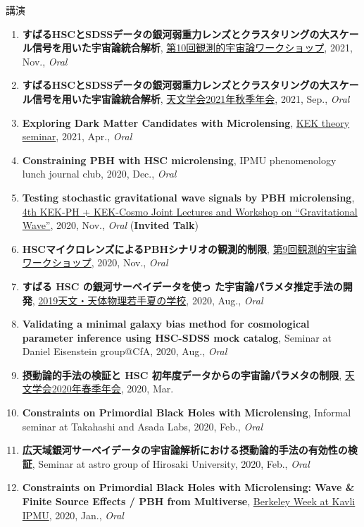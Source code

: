 \begin{rSection}{講演}
\begin{enumerate}
\item \textbf{すばるHSCとSDSSデータの銀河弱重力レンズとクラスタリングの大スケール信号を用いた宇宙論統合解析}, \href{https://sites.google.com/view/obscosmws2021main}{第10回観測的宇宙論ワークショップ}, 2021, Nov., \textit{Oral}
\item \textbf{すばるHSCとSDSSデータの銀河弱重力レンズとクラスタリングの大スケール信号を用いた宇宙論統合解析}, \href{https://www.asj.or.jp/nenkai/archive/2021b/pdf/U05a.pdf}{天文学会2021年秋季年会}, 2021, Sep., \textit{Oral}
\item \textbf{Exploring Dark Matter Candidates with Microlensing}, \href{https://www.kek.jp/ja/conference/20210407-3/}{KEK theory seminar}, 2021, Apr., \textit{Oral}
\item \textbf{Constraining PBH with HSC microlensing}, IPMU phenomenology lunch journal club, 2020, Dec., \textit{Oral}
\item \textbf{Testing stochastic gravitational wave signals by PBH microlensing}, \href{http://conference-indico.kek.jp/event/117/timetable/#day-2020-11-04}{4th KEK-PH + KEK-Cosmo Joint Lectures and Workshop on ``Gravitational Wave''}, 2020, Nov., \textit{Oral} (\textbf{Invited Talk})
\item \textbf{HSCマイクロレンズによるPBHシナリオの観測的制限}, \href{https://indico.ipmu.jp/event/382/timetable/#all}{第9回観測的宇宙論ワークショップ}, 2020, Nov., \textit{Oral}
\item \textbf{すばる HSC の銀河サーベイデータを使っ た宇宙論パラメタ推定手法の開発}, \href{http://www.astro-wakate.org/ss2019/web/}{2019天文・天体物理若手夏の学校}, 2020, Aug., \textit{Oral}
\item \textbf{Validating a minimal galaxy bias method for cosmological parameter inference using HSC-SDSS mock catalog}, Seminar at Daniel Eisenstein group@CfA, 2020, Aug., \textit{Oral}
\item \textbf{摂動論的手法の検証と HSC 初年度データからの宇宙論パラメタの制限}, \href{http://www.asj.or.jp/nenkai/archive/2020a/pdf/U03a.pdf}{天文学会2020年春季年会}, 2020, Mar.
\item \textbf{Constraints on Primordial Black Holes with Microlensing}, Informal seminar at Takahashi and Asada Labs, 2020, Feb., \textit{Oral}
\item \textbf{広天域銀河サーベイデータの宇宙論解析における摂動論的手法の有効性の検証}, Seminar at astro group of Hirosaki University, 2020, Feb., \textit{Oral}
\item \textbf{Constraints on Primordial Black Holes with Microlensing: Wave \& Finite Source Effects / PBH from Multiverse}, \href{http://indico.ipmu.jp/event/313/overview}{Berkeley Week at Kavli IPMU}, 2020, Jan., \textit{Oral}

\end{enumerate}
\end{rSection}
